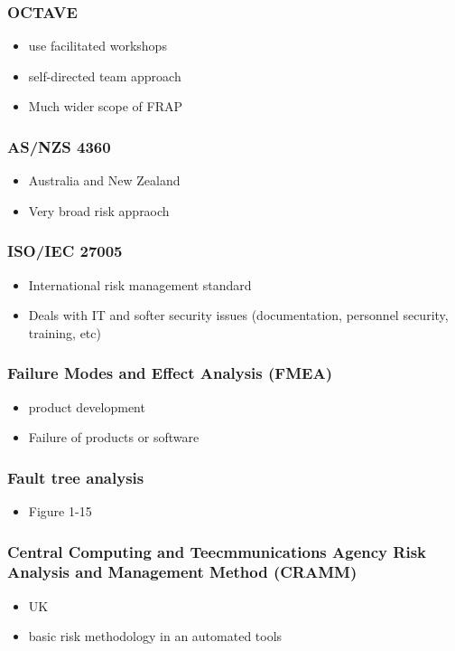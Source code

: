 \documentclass[11pt]{article}
\begin{document}
\subsubsection{OCTAVE}
\label{sec:org43f26cb}
\begin{itemize}
\item use facilitated workshops
\item self-directed team approach
\item Much wider scope of FRAP
\end{itemize}
\subsubsection{AS/NZS 4360}
\label{sec:org14d1efb}
\begin{itemize}
\item Australia and New Zealand
\item Very broad risk appraoch
\end{itemize}
\subsubsection{ISO/IEC 27005}
\label{sec:orgff690fc}
\begin{itemize}
\item International risk management standard
\item Deals with IT and softer security issues (documentation, personnel security, training, etc)
\end{itemize}
\subsubsection{Failure Modes and Effect Analysis (FMEA)}
\label{sec:orgf8df01a}
\begin{itemize}
\item product development
\item Failure of products or software
\end{itemize}
\subsubsection{Fault tree analysis}
\label{sec:org097e181}
\begin{itemize}
\item Figure 1-15
\end{itemize}
\subsubsection{Central Computing and Teecmmunications Agency Risk Analysis and Management Method (CRAMM)}
\label{sec:orgda2b0b6}
\begin{itemize}
\item UK
\item basic risk methodology in an automated tools
\end{itemize}
\end{document}
